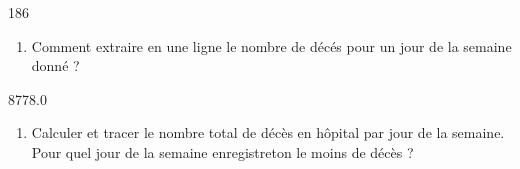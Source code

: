 \documentclass[letterpaper,10pt,english]{sphinxhowto}
\begin{document}
\begin{sphinxVerbatim}[commandchars=\\\{\}]
\end{sphinxVerbatim}

\begin{sphinxVerbatim}[commandchars=\\\{\}]
186
\end{sphinxVerbatim}
\begin{enumerate}
%
\setcounter{enumi}{8}
\item {} 
\sphinxAtStartPar
Comment extraire en une ligne le nombre de décés pour un jour de la semaine donné ?

\end{enumerate}

\begin{sphinxVerbatim}[commandchars=\\\{\}]
\PYG{p}{[}\PYG{p}{]}
\end{sphinxVerbatim}

\begin{sphinxVerbatim}[commandchars=\\\{\}]
8778.0
\end{sphinxVerbatim}
\begin{enumerate}
%
\setcounter{enumi}{9}
\item {} 
\sphinxAtStartPar
Calculer et tracer le nombre total de décès en hôpital par jour de la semaine. Pour quel jour de la semaine enregistre\sphinxhyphen{}t\sphinxhyphen{}on le moins de décès ?

\end{enumerate}

\begin{sphinxVerbatim}[commandchars=\\\{\}]
\PYG{p}{[}\PYG{p}{]}

   
      \PYG{p}{[}\PYG{p}{]}
    
\end{sphinxVerbatim}
\end{document}
